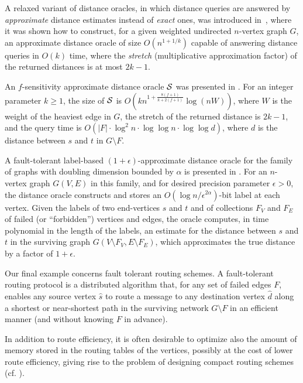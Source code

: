 \documentclass[12pt]{article}
\newcommand{\cS}[0]{{\cal S}}
\begin{document}
A relaxed variant of distance oracles, in which distance queries are answered
by {\em approximate} distance estimates instead of {\em exact} ones,
was introduced in~\cite{TZ05}, where it was
shown how to construct, for a given weighted undirected $n$-vertex graph $G$,
an approximate distance oracle of size $O(n^{1+1/k})$
capable of answering distance queries in $O(k)$ time,
where the {\em stretch} (multiplicative approximation factor)
of the returned distances is at most $2k-1$.
\par
An $f$-sensitivity approximate distance oracle $\cS$ was presented in
\cite{CLPR09-do}.
For an integer parameter $k\ge 1$, the size of $\cS$ is
$O(kn^{1+\frac{8(f+1)}{k+2(f+1)}}\log{(nW)})$, where $W$ is the weight of the
heaviest edge in $G$, the stretch of the returned distance is $2k-1$,
and the query time is $O(|F|\cdot\log^2n\cdot\log\log n\cdot\log\log d)$,
where $d$ is the distance between $s$ and $t$ in $G\setminus F$.
\par
A fault-tolerant label-based $(1+\epsilon)$-approximate distance oracle
for the family of graphs with doubling dimension bounded by $\alpha$
is presented in \cite{ACGP10}.
For an $n$-vertex graph $G(V,E)$ in this family,
and for desired precision parameter $\epsilon>0$,
the distance oracle constructs and stores
an $O(\log n / \epsilon^{2\alpha})$-bit label at each vertex.
Given the labels of two end-vertices $s$ and $t$ and of collections $F_V$
and $F_E$ of failed (or ``forbidden'') vertices and edges,
the oracle computes, in time polynomial in the length of the labels,
an estimate for the distance between $s$ and $t$ in the surviving graph
$G(V\setminus F_V, E\setminus F_E)$, which approximates the true distance
by a factor of $1+\epsilon$.

Our final example concerns fault tolerant routing schemes.
A fault-tolerant routing protocol is a distributed algorithm
that, for any set of failed edges $F$, enables any source vertex $\hat s$
to route a message to any destination vertex $\hat d$ along a shortest
or near-shortest path in the surviving network $G\setminus F$
in an efficient manner (and without knowing $F$ in advance).
\par
In addition to route efficiency, it is often desirable to optimize also
the amount of memory stored in the routing tables of the vertices, possibly
at the cost of lower route efficiency, giving rise to the problem
of designing compact routing schemes
(cf. \cite{ABLP-89:stoc,S12,Peleg00:book,PU-89:tables,TZ01}).
\end{document}

